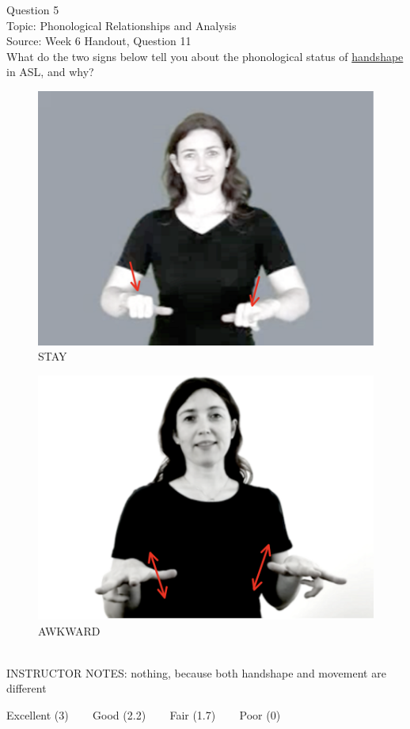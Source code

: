 \documentclass[12pt]{article}
\begin{document}
{\large Question 5}\\

Topic: Phonological Relationships and Analysis\\
Source: Week 6 Handout, Question 11\\

What do the two signs below tell you about the phonological status of \underline{handshape} in ASL, and why?\\

\begin{figure}[H]
\includegraphics{../images/asl_stay.png}
\caption{STAY}
\end{figure}
\begin{figure}[H]
\includegraphics{../images/asl_awkward.png}
\caption{AWKWARD}
\end{figure}

~\\
INSTRUCTOR NOTES: nothing, because both handshape and movement are different


\vfill
Excellent (3) ~~~ Good (2.2) ~~~ Fair (1.7) ~~~ Poor (0)
\newpage

\begin{center}
\textbf{{\color{red}{\HUGE END OF EXAM}}}\\

\end{center}
\newpage
\end{document}
